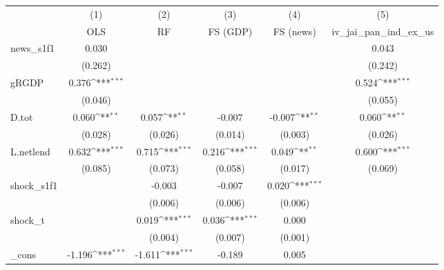 {
\def\sym#1{\ifmmode^{#1}\else\(^{#1}\)\fi}
\begin{tabular}{l*{5}{c}}
\toprule
            &\multicolumn{1}{c}{(1)}&\multicolumn{1}{c}{(2)}&\multicolumn{1}{c}{(3)}&\multicolumn{1}{c}{(4)}&\multicolumn{1}{c}{(5)}\\
            &\multicolumn{1}{c}{OLS}&\multicolumn{1}{c}{RF}&\multicolumn{1}{c}{FS (GDP)}&\multicolumn{1}{c}{FS (news)}&\multicolumn{1}{c}{iv\_jai\_pan\_ind\_ex\_us}\\
\midrule
news\_s1f1   &       0.030         &                     &                     &                     &       0.043         \\
            &     (0.262)         &                     &                     &                     &     (0.242)         \\
\addlinespace
gRGDP       &       0.376\sym{***}&                     &                     &                     &       0.524\sym{***}\\
            &     (0.046)         &                     &                     &                     &     (0.055)         \\
\addlinespace
D.tot       &       0.060\sym{**} &       0.057\sym{**} &      -0.007         &      -0.007\sym{**} &       0.060\sym{**} \\
            &     (0.028)         &     (0.026)         &     (0.014)         &     (0.003)         &     (0.026)         \\
\addlinespace
L.netlend   &       0.632\sym{***}&       0.715\sym{***}&       0.216\sym{***}&       0.049\sym{**} &       0.600\sym{***}\\
            &     (0.085)         &     (0.073)         &     (0.058)         &     (0.017)         &     (0.069)         \\
\addlinespace
shock\_s1f1  &                     &      -0.003         &      -0.007         &       0.020\sym{***}&                     \\
            &                     &     (0.006)         &     (0.006)         &     (0.006)         &                     \\
\addlinespace
shock\_t     &                     &       0.019\sym{***}&       0.036\sym{***}&       0.000         &                     \\
            &                     &     (0.004)         &     (0.007)         &     (0.001)         &                     \\
\addlinespace
\_cons      &      -1.196\sym{***}&      -1.611\sym{***}&      -0.189         &       0.005         &                     \\

\end{tabular}}
